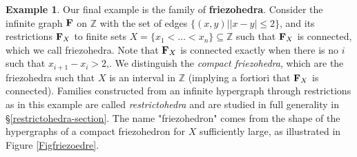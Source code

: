 \documentclass[11pt]{article}
\theoremstyle{definition}
\newtheorem{example}[theo]{Example}
\numberwithin{equation}{section}
\numberwithin{equation}{section}
\newcommand{\hyper}[1]{{\bf #1}}
\newcommand{\Friezo}{\hyper{F}}
\begin{document}
\begin{example} \label{expleFriezo}
Our final example is  the family of {\bf friezohedra}.  Consider the infinite graph $\Friezo$ on $\mathbb{Z}$ with the set of edges $\{(x,y) ||x-y|\leq 2 \}$, and its restrictions $\Friezo_X$ to finite sets $X=\{x_1<\dots<x_n\} \subseteq \mathbb{Z}$ such that $\Friezo_X$ is connected, which we call friezohedra. Note that $\Friezo_X$  is connected  exactly when there is no $i$ such that $x_{i+1}-x_i>2$,. 
We distinguish the \emph{compact friezohedra}, which are the friezohedra such that  
$X$ is an interval in $\mathbb{Z}$ (implying a fortiori that  $\Friezo_X$  is connected). Families constructed from an infinite hypergraph through restrictions as in this example are called \emph{restrictohedra} and are studied in full generality in \S\ref{restrictohedra-section}.
The name "friezohedron" comes from the shape of the hypergraphs of a compact friezohedron for $X$ sufficiently large, as illustrated in Figure \ref{Figfriezoedre}.
\begin{figure}
\centering
{}


\end{figure}
\end{example}
\end{document}
